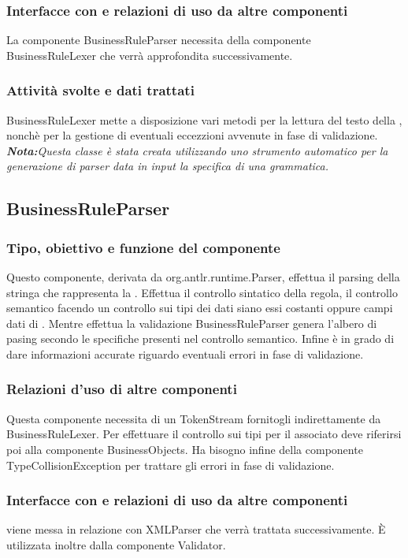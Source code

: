 \documentclass[11pt,titlepage,a4paper]{report}
\begin{document}
\subsubsection{Interfacce con e relazioni di uso da altre componenti}
La componente BusinessRuleParser necessita della componente BusinessRuleLexer che verr\`a approfondita successivamente.
\subsubsection{Attivit\`a svolte e dati trattati}
BusinessRuleLexer mette a disposizione vari metodi per la lettura del testo della \br, nonch\`e per la gestione di eventuali eccezzioni avvenute in fase di validazione.\\
\textit{\textbf{Nota:}Questa classe \`e stata creata utilizzando uno strumento automatico per la generazione di parser data in input la specifica di una grammatica.}

\subsection{BusinessRuleParser}
\subsubsection{Tipo, obiettivo e funzione del componente}
Questo componente, derivata da org.antlr.runtime.Parser, effettua il parsing della stringa che rappresenta la \br. Effettua il controllo sintatico della regola, il controllo semantico facendo un controllo sui tipi dei dati siano essi costanti oppure campi dati di \bos. Mentre effettua la validazione BusinessRuleParser genera l'albero di pasing secondo le specifiche presenti nel controllo semantico. Infine \`e in grado di dare informazioni accurate riguardo eventuali errori in fase di validazione.
\subsubsection{Relazioni d'uso di altre componenti}
Questa componente necessita di un TokenStream fornitogli indirettamente da BusinessRuleLexer. Per effettuare il controllo sui tipi per il \bo associato deve riferirsi poi alla componente BusinessObjects. Ha bisogno infine della componente TypeCollisionException per trattare gli errori in fase di validazione.
\subsubsection{Interfacce con e relazioni di uso da altre componenti}
\brp viene messa in relazione con XMLParser che verr\`a trattata successivamente.
\`E utilizzata inoltre dalla componente Validator.
\end{document}
